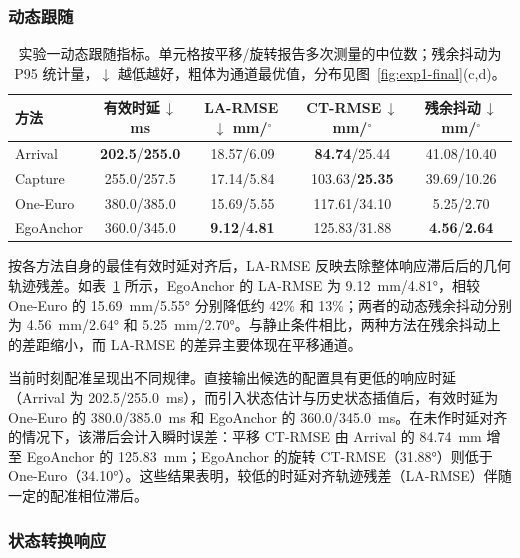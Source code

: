 \documentclass[review]{vgtc}
\begin{document}
\subsubsection{动态跟随}

\begin{table}[t]
\centering
\caption{实验一动态跟随指标。单元格按平移/旋转报告多次测量的中位数；残余抖动为 P95 统计量，$\downarrow$ 越低越好，粗体为通道最优值，分布见图~\ref{fig:exp1-final}(c,d)。}
\label{tab:exp1-dynamic}
\setlength{\tabcolsep}{2pt}
\begin{tabular}{@{}lcccc@{}}
\toprule
方法 & \shortstack{有效时延\,$\downarrow$\\ms} & \shortstack{LA-RMSE\,$\downarrow$\\mm/$^\circ$} & \shortstack{CT-RMSE\,$\downarrow$\\mm/$^\circ$} & \shortstack{残余抖动\,$\downarrow$\\mm/$^\circ$} \\
\midrule
Arrival   & \textbf{202.5}/\textbf{255.0} & 18.57/6.09 & \textbf{84.74}/25.44 & 41.08/10.40 \\
Capture   & 255.0/257.5 & 17.14/5.84 & 103.63/\textbf{25.35} & 39.69/10.26 \\
One-Euro  & 380.0/385.0 & 15.69/5.55 & 117.61/34.10 & 5.25/2.70 \\
EgoAnchor & 360.0/345.0 & \textbf{9.12}/\textbf{4.81} & 125.83/31.88 & \textbf{4.56}/\textbf{2.64} \\
\bottomrule
\end{tabular}
\end{table}

按各方法自身的最佳有效时延对齐后，LA-RMSE 反映去除整体响应滞后后的几何轨迹残差。如表~\ref{tab:exp1-dynamic} 所示，EgoAnchor 的 LA-RMSE 为 9.12~mm/4.81°，相较 One-Euro 的 15.69~mm/5.55° 分别降低约 42\% 和 13\%；两者的动态残余抖动分别为 4.56~mm/2.64° 和 5.25~mm/2.70°。与静止条件相比，两种方法在残余抖动上的差距缩小，而 LA-RMSE 的差异主要体现在平移通道。

当前时刻配准呈现出不同规律。直接输出候选的配置具有更低的响应时延（Arrival 为 202.5/255.0~ms），而引入状态估计与历史状态插值后，有效时延为 One-Euro 的 380.0/385.0~ms 和 EgoAnchor 的 360.0/345.0~ms。在未作时延对齐的情况下，该滞后会计入瞬时误差：平移 CT-RMSE 由 Arrival 的 84.74~mm 增至 EgoAnchor 的 125.83~mm；EgoAnchor 的旋转 CT-RMSE（31.88°）则低于 One-Euro（34.10°）。这些结果表明，较低的时延对齐轨迹残差（LA-RMSE）伴随一定的配准相位滞后。

\subsubsection{状态转换响应}
\end{document}
